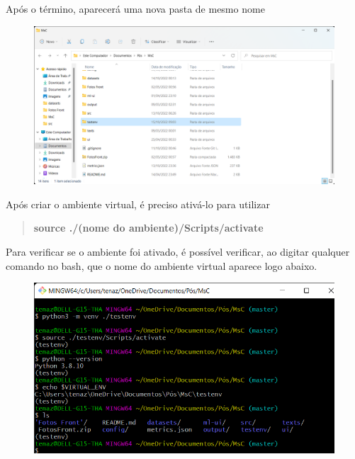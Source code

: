 \documentclass[letterpaper]{article}
\begin{document}
Após o término, aparecerá uma nova pasta de mesmo nome

\begin{figure}[h!]
\centering
\includegraphics[scale=0.25]{images/virtualenv.png}
\label{fig:DocInstallVirtualEnvFolder}
\end{figure}

Após criar o ambiente virtual, é preciso ativá-lo para utilizar

\begin{quote}\textbf{source ./(nome do ambiente)/Scripts/activate}\end{quote}

Para verificar se o ambiente foi ativado, é possível verificar, ao digitar qualquer comando no bash, que o nome do ambiente virtual aparece logo abaixo.

\begin{figure}[h!]
\centering
\includegraphics[scale=0.4]{images/virtualenv-check.png}
\label{fig:DocInstallVirtualEnvCheck}
\end{figure}
\end{document}
